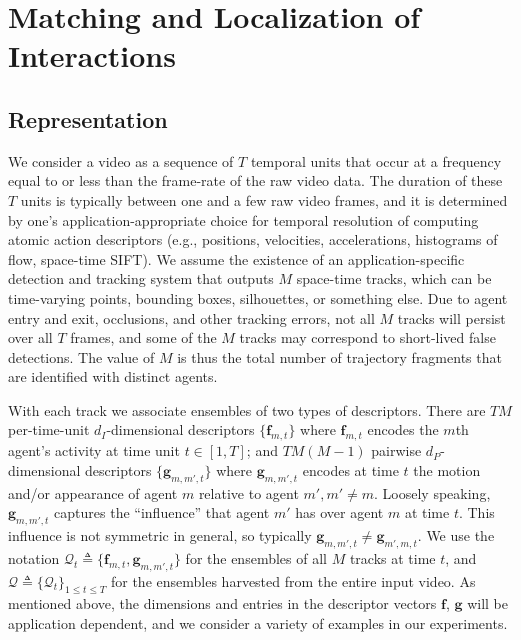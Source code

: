 \section{Matching and Localization of Interactions}

\vspace{-5pt}

\subsection{Representation}

\vspace{-5pt}

We consider a video as a sequence of $T$ temporal units that occur at a frequency equal to or less than the frame-rate of the raw video data. The duration of these $T$ units is typically between one and a  few raw video frames, and it is determined by one's application-appropriate choice for temporal resolution of computing atomic action descriptors (e.g., positions, velocities, accelerations, histograms of flow, space-time SIFT). We assume the existence of an application-specific detection and tracking system that outputs $M$ space-time tracks, which can be time-varying points, bounding boxes, silhouettes, or something else. Due to agent entry and exit, occlusions, and other tracking errors, not all $M$ tracks will persist over all $T$ frames, and some of the $M$ tracks may correspond to short-lived false detections.  The value of $M$ is thus the total number of trajectory fragments that are identified with distinct agents.

With each track we associate ensembles of two types of descriptors. There are $TM$ per-time-unit $d_{I}$-dimensional descriptors $\{\mathbf{f}_{m,t}\}$ where $\mathbf{f}_{m,t}$ encodes the $m$th agent's activity at time unit $t\in[1, T]$; and $TM(M-1)$ pairwise $d_{P}$-dimensional descriptors $\{\mathbf{g}_{m,m',t}\}$ where $\mathbf{g}_{m,m',t}$ encodes at time $t$ the motion and/or appearance of agent $m$ relative to agent $m', m'\ne m$. Loosely speaking, $\mathbf{g}_{m,m',t}$ captures the ``influence'' that agent $m'$ has over agent $m$ at time $t$. This influence is not symmetric in general, so typically $\mathbf{g}_{m,m',t}\ne \mathbf{g}_{m',m,t}$.  We use the notation $\mathcal{Q}_{t}\triangleq\{\mathbf{f}_{m,t},\mathbf{g}_{m,m',t}\}$ for the ensembles of all $M$ tracks at time $t$, and $\mathcal{Q}\triangleq\{\mathcal{Q}_{t}\}_{1\leq t\leq T}$ for the ensembles harvested from the entire input video. As mentioned above, the dimensions and entries in the descriptor vectors $\mathbf{f}$, $\mathbf{g}$ will be application dependent, and we consider a variety of examples in our experiments.

